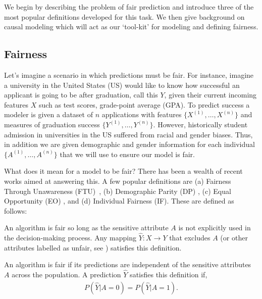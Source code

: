 We begin by describing the problem of fair prediction and introduce three of the most popular definitions developed for this task.  We then give background on causal modeling which will act as our `tool-kit' for modeling and defining fairness.

\subsection{Fairness}
Let's imagine a scenario in which predictions must be fair. For instance, imagine a university in the United States (US) would like to know how successful an applicant is going to be after graduation, call this $Y$, given their current incoming features $X$ such as test scores, grade-point average (GPA). To predict success a modeler is given a dataset of $n$ applications with features $\{X^{(1)}, \ldots, X^{(n)} \}$ and measures of graduation success $\{Y^{(1)}, \ldots, Y^{(n)}\}$. However, historically  student admission \cite{kane1998racial,kidder2000portia} in universities in the US suffered from racial and gender biases. Thus, in addition we are given demographic and gender information for each individual $\{A^{(1)}, \ldots, A^{(n)}\}$ that we will use to ensure our model is fair.

What does it mean for a model to be fair?  There has
been a wealth of recent works aimed at answering this. A few popular
definitions are (a) Fairness Through Unawareness
(FTU)~\citep{dwork2012fairness,grgiccase}, (b) Demographic Parity (DP)
\citep{kleinberg2016inherent}, (c) Equal Opportunity (EO)
\citep{kleinberg2016inherent}, and (d) Individual Fairness (IF). These
are defined as follows:

\begin{define}
  An algorithm is fair so long as the sensitive attribute $A$ is not
  explicitly used in the decision-making process. Any mapping
  $\hat{Y}: X \rightarrow Y$ that excludes $A$ (or other attributes
  labelled as unfair, see \citet{grgiccase}) satisfies this
  definition.
\end{define}

\begin{define}
An algorithm is fair if its predictions are independent of the sensitive attributes $A$ across the population. A prediction $\hat{Y}$ satisfies this definition if, 
\begin{align}
P(\hat{Y} | A = 0) = P(\hat{Y} | A = 1). \nonumber
\end{align}
\end{define}

